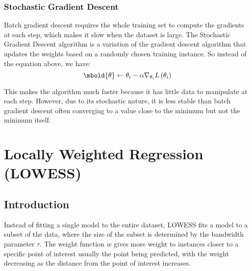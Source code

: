 \documentclass[12pt letter]{report}
\begin{document}
\subsection{Stochastic Gradient Descent}


Batch gradient descent requires the whole training set to compute the gradients at each step, which makes it slow when
the dataset is large. The Stochastic Gradient Descent algorithm is a variation of the gradient descent algorithm that
updates the weights based on a randomly chosen training instance. So instead of the equation above, we have:
\[
  \mbold{\theta} \gets  \theta_i - \alpha \nabla_{\theta_i} L \left( \theta_i \right)
\]

This makes the algorithm much faster because it has little data to manipulate at each step. However, due to its
stochastic nature, it is less stable than batch gradient descent often converging to a value close to the minimum but
not the minimum itself.

\chapter{Locally Weighted Regression (LOWESS)}

\section{Introduction}


Instead of fitting a single model to the entire dataset, LOWESS fits a model to a subset of the data, where the size of
the subset is determined by the bandwidth parameter $\tau$. The weight function $w$ gives more weight to instances
closer to a specific point of interest usually the point being predicted, with the weight decreasing as the distance
from the point of interest increases.
\end{document}
